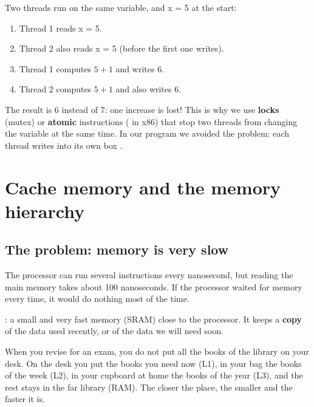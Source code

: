 \begin{mithal}
    Two threads run  on the same variable, and x = 5 at the start:
    \begin{enumerate}
        \item Thread 1 reads x = 5.
        \item Thread 2 also reads x = 5 (before the first one writes).
        \item Thread 1 computes $5 + 1$ and writes 6.
        \item Thread 2 computes $5 + 1$ and also writes 6.
    \end{enumerate}
    The result is 6 instead of 7: one increase is lost! This is why we use \textbf{locks} (mutex) or \textbf{atomic}
    instructions ( in x86) that stop two threads from changing the variable at the same time. In our program
    we avoided the problem: each thread writes into its own box .
\end{mithal}

\section{Cache memory and the memory hierarchy}

\subsection{The problem: memory is very slow}
The processor can run several instructions every nanosecond, but reading the main memory takes about 100 nanoseconds.
If the processor waited for memory every time, it would do nothing most of the time.

\begin{tarif}
    : a small and very fast memory (SRAM) close to the processor. It keeps a
    \textbf{copy} of the data used recently, or of the data we will need soon.
\end{tarif}

\begin{tashbih}
    When you revise for an exam, you do not put all the books of the library on your desk. On the desk you put the books you
    need now (L1), in your bag the books of the week (L2), in your cupboard at home the books of the year (L3), and the rest
    stays in the far library (RAM). The closer the place, the smaller and the faster it is.
\end{tashbih}

